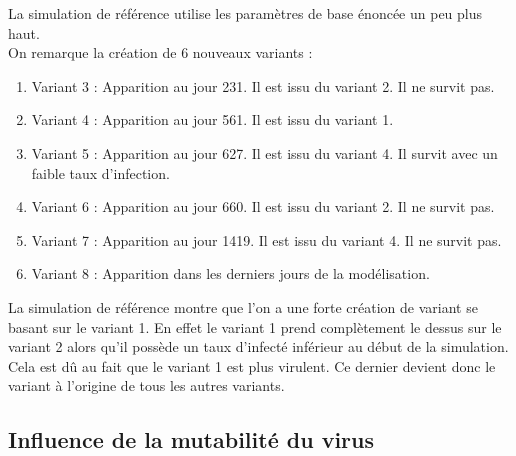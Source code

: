 \documentclass{article}
\begin{document}
\noindent
La simulation de référence utilise les paramètres de base énoncée un peu plus haut. \\
On remarque la création de 6 nouveaux variants :
\begin{enumerate}
    \item Variant 3 : Apparition au jour 231. Il est issu du variant 2. Il ne survit pas.
    \item Variant 4 : Apparition au jour 561. Il est issu du variant 1.
    \item Variant 5 : Apparition au jour 627. Il est issu du variant 4. Il survit avec un faible taux d'infection.
    \item Variant 6 : Apparition au jour 660. Il est issu du variant 2. Il ne survit pas.
    \item Variant 7 : Apparition au jour 1419. Il est issu du variant 4. Il ne survit pas.
    \item Variant 8 : Apparition dans les derniers jours de la modélisation.
\end{enumerate}
\noindent
La simulation de référence montre que l'on a une forte création de variant se basant sur le variant 1. En effet le variant 1 prend complètement le dessus sur le variant 2 alors qu'il possède un taux d'infecté inférieur au début de la simulation. Cela est dû au fait que le variant 1 est plus virulent. Ce dernier devient donc le variant à l'origine de tous les autres variants.

\subsection{Influence de la mutabilité du virus}
\end{document}
